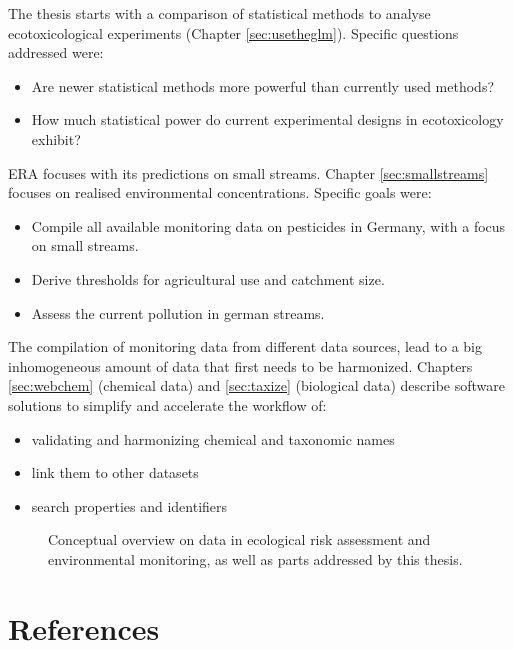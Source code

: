 \noindent
The thesis starts with a comparison of statistical methods to analyse ecotoxicological experiments (Chapter \ref{sec:usetheglm}). 
Specific questions addressed were:

\begin{itemize}
	\item Are newer statistical methods more powerful than currently used methods?
	\item How much statistical power do current experimental designs in ecotoxicology exhibit?
\end{itemize}

\noindent
ERA focuses with its predictions on small streams. Chapter \ref{sec:smallstreams} focuses on realised environmental concentrations.
Specific goals were:
\begin{itemize}
	\item Compile all available monitoring data on pesticides in Germany, with a focus on small streams.
	\item Derive thresholds for agricultural use and catchment size.
	\item Assess the current pollution in german streams.
\end{itemize}

\noindent
The compilation of monitoring data from different data sources, lead to a big inhomogeneous amount of data that first needs to be harmonized.
Chapters \ref{sec:webchem} (chemical data) and \ref{sec:taxize} (biological data) describe software solutions to simplify and accelerate the workflow of:

\begin{itemize}
	\item validating and harmonizing chemical and taxonomic names
	\item link them to other datasets
	\item search properties and identifiers
\end{itemize}


\begin{figure}[h]
	\centering
	\resizebox{\textwidth}{!}{%
		
	}
	\caption[Conceptual overview of the topics addressed by this thesis]{Conceptual overview on data in ecological risk assessment and environmental monitoring, as well as parts addressed by this thesis.}
	\label{fig:intro:overview}
\end{figure}




\section{References}
\printbibliography[heading=none]
